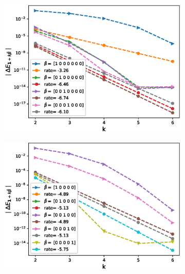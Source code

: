 \begin{figure}[htb]
\begin{subfigure}{0.4\textwidth}
		\includegraphics[width=\linewidth]{./figures/Heston_single_call_QE_moment_matching/mixed_rates/set3/N_4/first_difference_heston_4steps_hierarchical}
		\caption{}
		\label{fig:3}
	\end{subfigure}
		\begin{subfigure}{0.4\textwidth}
		\includegraphics[width=\linewidth]{./figures/Heston_single_call_smooth_vol/mixed_rates/set3/N_2/first_difference_heston_2steps_spot_hierarchical}
		\caption{}
		\label{fig:4}
	\end{subfigure}

\end{figure}
